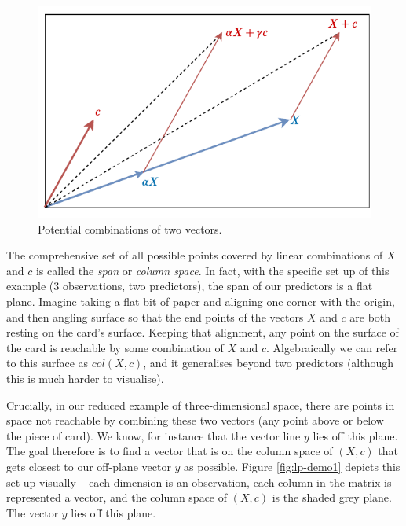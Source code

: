 \documentclass[
]{book}
\begin{document}
\begin{figure}
\includegraphics[width=1\linewidth]{images/span} \caption{Potential combinations of two vectors.}\label{fig:lp-span}
\end{figure}

The comprehensive set of all possible points covered by linear combinations of \(X\) and \(c\) is called the \emph{span} or \emph{column space}. In fact, with the specific set up of this example (3 observations, two predictors), the span of our predictors is a flat plane. Imagine taking a flat bit of paper and aligning one corner with the origin, and then angling surface so that the end points of the vectors \(X\) and \(c\) are both resting on the card's surface. Keeping that alignment, any point on the surface of the card is reachable by some combination of \(X\) and \(c\). Algebraically we can refer to this surface as \(col(X,c)\), and it generalises beyond two predictors (although this is much harder to visualise).

Crucially, in our reduced example of three-dimensional space, there are points in space not reachable by combining these two vectors (any point above or below the piece of card). We know, for instance that the vector line \(y\) lies off this plane. The goal therefore is to find a vector that is on the column space of \((X,c)\) that gets closest to our off-plane vector \(y\) as possible. Figure \ref{fig:lp-demo1} depicts this set up visually -- each dimension is an observation, each column in the matrix is represented a vector, and the column space of \((X,c)\) is the shaded grey plane. The vector \(y\) lies off this plane.
\end{document}
